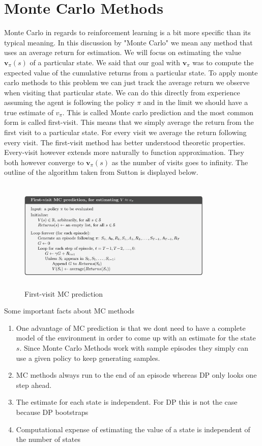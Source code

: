 \section{Monte Carlo Methods}

Monte Carlo in regards to reinforcement learning is a bit more specific than its typical meaning. In this discussion by "Monte Carlo" we mean any method that uses an average return for estimation. We will focus on estimating the value $\mathbf{v}_{\pi}(s)$ of a particular state. We said that our goal with $\mathbf{v}_{\pi}$ was to compute the expected value of the cumulative returns from a particular state. To apply monte carlo methods to this problem we can just track the average return we observe when visiting that particular state. We can do this directly from experience assuming the agent is following the policy $\pi$ and in the limit we should have a true estimate of $v_{\pi}$. This is called Monte carlo prediction and the most common form is called first-visit. This means that we simply average the return from the first visit to a particular state. For every visit we average the return following every visit. The first-visit method  has better understood theoretic properties. Every-visit however extends more naturally to function approximation. They both however converge to $\mathbf{v}_{\pi}(s)$ as the number of visits goes to infinity. The outline of the algorithm taken from Sutton is displayed below. 

\begin{figure}[H]
        \centering
        \includegraphics[width=350px,height=200px]{images/first-visit-mc.png}
        \caption{First-visit MC prediction}
        \label{fig:my_label}
    \end{figure}

Some important facts about MC methods

\begin{enumerate}
    \item One advantage of MC prediction is that we dont need to have a complete model of the environment in order to come up with an estimate for the state $s$. Since Monte Carlo Methods work with sample episodes they simply can use a given policy to keep generating samples.
    \item MC methods always run to the end of an episode whereas DP only looks one step ahead. 
    \item The estimate for each state is independent. For DP this is not the case because DP bootstraps
    \item Computational expense of estimating the value of a state is independent of the number of states
\end{enumerate}

